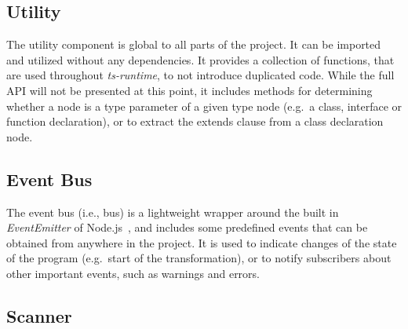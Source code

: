 \subsection{Utility}

The utility component is global to all parts of the project. It can be imported and utilized without any dependencies. It provides a collection of functions, that are used throughout \emph{ts-runtime}, to not introduce duplicated code. While the full API will not be presented at this point, it includes methods for determining whether a node is a type parameter of a given type node (e.g.\ a class, interface or function declaration), or to extract the extends clause from a class declaration node.

\subsection{Event Bus}

The event bus (i.e., bus) is a lightweight wrapper around the built in \emph{EventEmitter} of Node.js~\cite{Node:API:Events}, and includes some predefined events that can be obtained from anywhere in the project. It is used to indicate changes of the state of the program (e.g.\ start of the transformation), or to notify subscribers about other important events, such as warnings and errors.

\subsection{Scanner}

